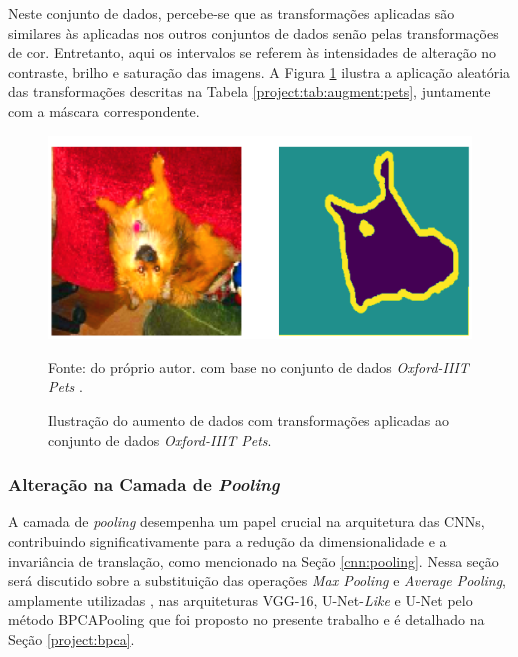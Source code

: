 Neste conjunto de dados, percebe-se que as transformações aplicadas são similares às aplicadas nos outros conjuntos de dados senão pelas transformações de cor. Entretanto, aqui os intervalos se referem às intensidades de alteração no contraste, brilho e saturação das imagens. A Figura \ref{project:fig:augment:pets} ilustra a aplicação aleatória das transformações descritas na Tabela \ref{project:tab:augment:pets}, juntamente com a máscara correspondente.

\begin{figure}[H]
    \centering
   \caption[Aumento de dados com transformações geométricas - \textit{Oxford-IIIT Pets}.]{Ilustração do aumento de dados com transformações aplicadas ao conjunto de dados \textit{Oxford-IIIT Pets}.}
    \label{project:fig:augment:pets}
    \includegraphics[width=1\textwidth]{recursos/imagens/project/dataaugmentation_pets.png}

    Fonte: do próprio autor. com base no conjunto de dados \textit{Oxford-IIIT Pets} \citep{Parkhi2012CatsDogs}.
\end{figure}


\subsubsection{Alteração na Camada de \textit{Pooling}}
\label{project:change_pooling}
A camada de \textit{pooling} desempenha um papel crucial na arquitetura das CNNs, contribuindo significativamente para a redução da dimensionalidade e a invariância de translação, como mencionado na Seção \ref{cnn:pooling}. Nessa seção será discutido sobre a substituição das operações \textit{Max Pooling} e \textit{Average Pooling}, amplamente utilizadas \citep{Ozdemir2023Avg-topk:Networks}, nas arquiteturas VGG-16, U-Net-\textit{Like} e U-Net pelo método BPCAPooling que foi proposto no presente trabalho e é detalhado na Seção \ref{project:bpca}.

